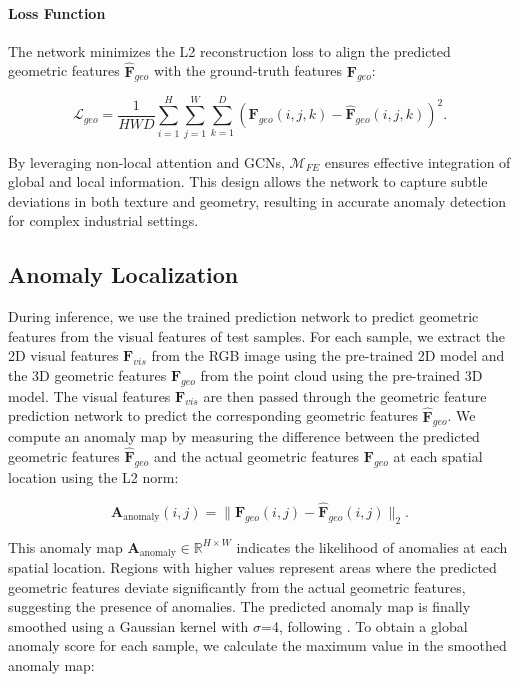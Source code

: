 \paragraph*{Loss Function}
The network minimizes the L2 reconstruction loss to align the predicted geometric features $\hat{\mathbf{F}}_{geo}$ with the ground-truth features $\mathbf{F}_{geo}$:

\begin{equation}
\mathcal{L}_{geo} = \frac{1}{HWD} \sum_{i=1}^{H} \sum_{j=1}^{W} \sum_{k=1}^{D} \left( \mathbf{F}_{geo}(i, j, k) - \hat{\mathbf{F}}_{geo}(i, j, k) \right)^2.
\end{equation}

\noindent By leveraging non-local attention and GCNs, $\mathcal{M}_{FE}$ ensures effective integration of global and local information. This design allows the network to capture subtle deviations in both texture and geometry, resulting in accurate anomaly detection for complex industrial settings.

\subsection*{Anomaly Localization}

During inference, we use the trained prediction network to predict geometric features from the visual features of test samples. For each sample, we extract the 2D visual features $\mathbf{F}_{vis}$ from the RGB image using the pre-trained 2D model and the 3D geometric features $\mathbf{F}_{geo}$ from the point cloud using the pre-trained 3D model. The visual features $\mathbf{F}_{vis}$ are then passed through the geometric feature prediction network to predict the corresponding geometric features $\hat{\mathbf{F}}_{geo}$. We compute an anomaly map by measuring the difference between the predicted geometric features $\hat{\mathbf{F}}_{geo}$ and the actual geometric features $\mathbf{F}_{geo}$ at each spatial location using the L2 norm:

\begin{equation}
\mathbf{A}_{\text{anomaly}}(i, j) = \|\mathbf{F}_{geo}(i, j) - \hat{\mathbf{F}}_{geo}(i, j)\|_2.
\end{equation}

\noindent This anomaly map $\mathbf{A}_{\text{anomaly}} \in \mathbb{R}^{H \times W}$ indicates the likelihood of anomalies at each spatial location. Regions with higher values represent areas where the predicted geometric features deviate significantly from the actual geometric features, suggesting the presence of anomalies. The predicted anomaly map is finally smoothed using a Gaussian kernel with $\sigma$=4, following \cite{roth2022towards}. To obtain a global anomaly score for each sample, we calculate the maximum value in the smoothed anomaly map:

